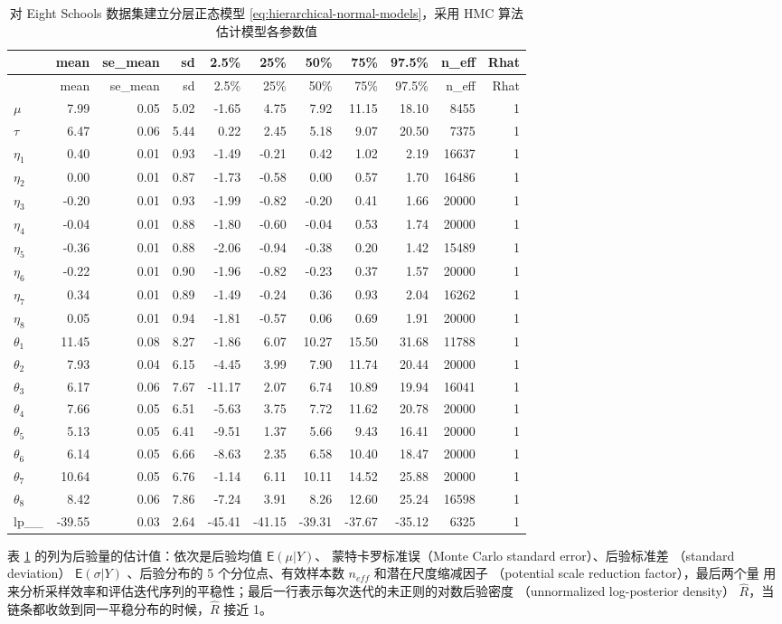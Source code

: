 \documentclass[12pt,a4paper,UTF8,twoside]{book}
\theoremstyle{definition}
\theoremstyle{definition}
\theoremstyle{definition}
\theoremstyle{remark}
\begin{document}
\begin{longtable}[]{@{}lrrrrrrrrrr@{}}
\caption{\label{tab:eight-schools-output} 对 Eight Schools 数据集建立分层正态模型 \eqref{eq:hierarchical-normal-models}，采用 HMC 算法估计模型各参数值}\tabularnewline
\toprule
& mean & se\_mean & sd & 2.5\% & 25\% & 50\% & 75\% & 97.5\% & n\_eff & Rhat\tabularnewline
\midrule
\endfirsthead
\toprule
& mean & se\_mean & sd & 2.5\% & 25\% & 50\% & 75\% & 97.5\% & n\_eff & Rhat\tabularnewline
\midrule
\endhead
\(\mu\) & 7.99 & 0.05 & 5.02 & -1.65 & 4.75 & 7.92 & 11.15 & 18.10 & 8455 & 1\tabularnewline
\(\tau\) & 6.47 & 0.06 & 5.44 & 0.22 & 2.45 & 5.18 & 9.07 & 20.50 & 7375 & 1\tabularnewline
\(\eta_1\) & 0.40 & 0.01 & 0.93 & -1.49 & -0.21 & 0.42 & 1.02 & 2.19 & 16637 & 1\tabularnewline
\(\eta_2\) & 0.00 & 0.01 & 0.87 & -1.73 & -0.58 & 0.00 & 0.57 & 1.70 & 16486 & 1\tabularnewline
\(\eta_3\) & -0.20 & 0.01 & 0.93 & -1.99 & -0.82 & -0.20 & 0.41 & 1.66 & 20000 & 1\tabularnewline
\(\eta_4\) & -0.04 & 0.01 & 0.88 & -1.80 & -0.60 & -0.04 & 0.53 & 1.74 & 20000 & 1\tabularnewline
\(\eta_5\) & -0.36 & 0.01 & 0.88 & -2.06 & -0.94 & -0.38 & 0.20 & 1.42 & 15489 & 1\tabularnewline
\(\eta_6\) & -0.22 & 0.01 & 0.90 & -1.96 & -0.82 & -0.23 & 0.37 & 1.57 & 20000 & 1\tabularnewline
\(\eta_7\) & 0.34 & 0.01 & 0.89 & -1.49 & -0.24 & 0.36 & 0.93 & 2.04 & 16262 & 1\tabularnewline
\(\eta_8\) & 0.05 & 0.01 & 0.94 & -1.81 & -0.57 & 0.06 & 0.69 & 1.91 & 20000 & 1\tabularnewline
\(\theta_1\) & 11.45 & 0.08 & 8.27 & -1.86 & 6.07 & 10.27 & 15.50 & 31.68 & 11788 & 1\tabularnewline
\(\theta_2\) & 7.93 & 0.04 & 6.15 & -4.45 & 3.99 & 7.90 & 11.74 & 20.44 & 20000 & 1\tabularnewline
\(\theta_3\) & 6.17 & 0.06 & 7.67 & -11.17 & 2.07 & 6.74 & 10.89 & 19.94 & 16041 & 1\tabularnewline
\(\theta_4\) & 7.66 & 0.05 & 6.51 & -5.63 & 3.75 & 7.72 & 11.62 & 20.78 & 20000 & 1\tabularnewline
\(\theta_5\) & 5.13 & 0.05 & 6.41 & -9.51 & 1.37 & 5.66 & 9.43 & 16.41 & 20000 & 1\tabularnewline
\(\theta_6\) & 6.14 & 0.05 & 6.66 & -8.63 & 2.35 & 6.58 & 10.40 & 18.47 & 20000 & 1\tabularnewline
\(\theta_7\) & 10.64 & 0.05 & 6.76 & -1.14 & 6.11 & 10.11 & 14.52 & 25.88 & 20000 & 1\tabularnewline
\(\theta_8\) & 8.42 & 0.06 & 7.86 & -7.24 & 3.91 & 8.26 & 12.60 & 25.24 & 16598 & 1\tabularnewline
lp\_\_ & -39.55 & 0.03 & 2.64 & -45.41 & -41.15 & -39.31 & -37.67 & -35.12 & 6325 & 1\tabularnewline
\bottomrule
\end{longtable}

表 \ref{tab:eight-schools-output} 的列为后验量的估计值：依次是后验均值 \(\mathsf{E}(\mu|Y)\)、 蒙特卡罗标准误（Monte Carlo standard error）、后验标准差 （standard deviation） \(\mathsf{E}(\sigma|Y)\) 、后验分布的 5 个分位点、有效样本数 \(n_{eff}\) 和潜在尺度缩减因子 （potential scale reduction factor），最后两个量 用来分析采样效率和评估迭代序列的平稳性；最后一行表示每次迭代的未正则的对数后验密度 （unnormalized log-posterior density） \(\hat{R}\)，当链条都收敛到同一平稳分布的时候，\(\hat{R}\) 接近 1。
\end{document}
